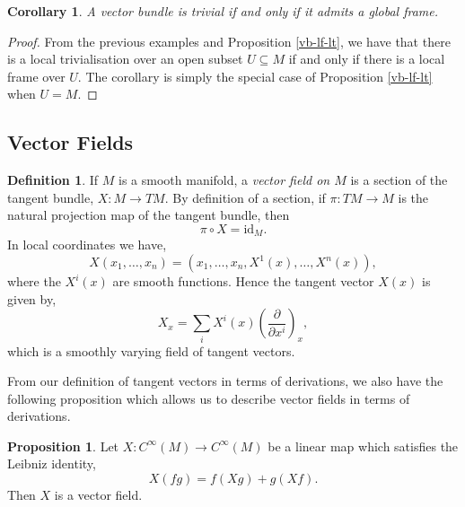 \documentclass[12pt,a4paper]{article}
\numberwithin{equation}{section}
\newtheorem{corollary}{Corollary}[section]
\theoremstyle{definition}
\newtheorem{definition}{Definition}[section]
\newtheorem{proposition}{Proposition}[section]
\theoremstyle{remark}
\begin{document}
\begin{corollary}
A vector bundle is trivial if and only if it admits a global frame.
\end{corollary}
\begin{proof}
From the previous examples and Proposition \ref{vb-lf-lt}, we have that there is a local trivialisation over an open subset $U\subseteq M$ if and only if there is a local frame over $U$. The corollary is simply the special case of Proposition \ref{vb-lf-lt} when $U=M$.
\end{proof}
\pagebreak
\subsection{Vector Fields}
\begin{definition}
If $M$ is a smooth manifold, a \textit{vector field on $M$} is a section of the tangent bundle, $X:M\to TM$. By definition of a section, if $\pi:TM\to M$ is the natural projection map of the tangent bundle, then
\[
\pi\circ X=\mathrm{id}_M.
\] 
In local coordinates we have,
\[
X(x_1,\ldots,x_n)=(x_1,\ldots,x_n,X^1(x),\ldots,X^n(x)),
\]
where the $X^i(x)$ are smooth functions. Hence the tangent vector $X(x)$ is given by,
\begin{equation}
X_x=\sum_iX^i(x)\left(\frac{\partial}{\partial x^i}\right)_x,
\label{eq:vect-local}
\end{equation}
which is a smoothly varying field of tangent vectors.
\end{definition}
From our definition of tangent vectors in terms of derivations, we also have the following proposition which allows us to describe vector fields in terms of derivations.
\begin{proposition}
Let $X:C^{\infty}(M)\to C^{\infty}(M)$ be a linear map which satisfies the Leibniz identity,
\[
X(fg)=f(Xg)+g(Xf).
\]
Then $X$ is a vector field.
\end{proposition}
\end{document}
